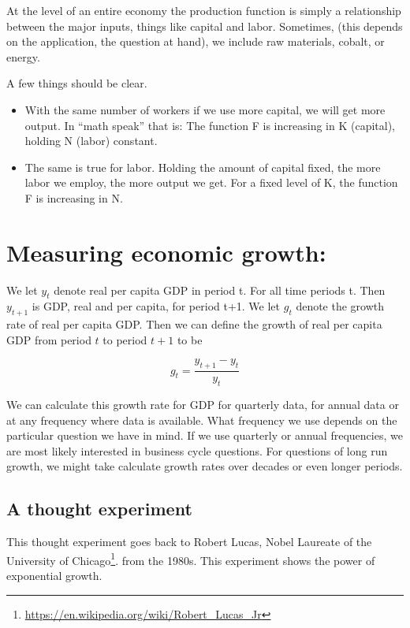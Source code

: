 \documentclass[
]{book}
\providecommand{\tightlist}{%
  \setlength{\itemsep}{0pt}\setlength{\parskip}{0pt}}
\begin{document}
At the level of an entire economy the production function is simply a relationship between the major inputs, things like capital and labor. Sometimes, (this depends on the application, the question at hand), we include raw materials, cobalt, or energy.

A few things should be clear.

\begin{itemize}
\tightlist
\item
  With the same number of workers if we use more capital, we will get more output. In ``math speak'' that is: The function F is increasing in K (capital), holding N (labor) constant.\\
\item
  The same is true for labor. Holding the amount of capital fixed, the more labor we employ, the more output we get. For a fixed level of K, the function F is increasing in N.
\end{itemize}

\hypertarget{measuring-economic-growth}{%
\section{Measuring economic growth:}\label{measuring-economic-growth}}

We let \(y_t\) denote real per capita GDP in period t. For all time periods t. Then \(y_{t+1}\) is GDP, real and per capita, for period t+1. We let \(g_t\) denote the growth rate of real per capita GDP. Then we can define the growth of real per capita GDP from period \(t\) to period \(t+1\) to be

\[g_t = \frac{y_{t+1} - y_t}{y_t}\]

We can calculate this growth rate for GDP for quarterly data, for annual data or at any frequency where data is available. What frequency we use depends on the particular question we have in mind. If we use quarterly or annual frequencies, we are most likely interested in business cycle questions. For questions of long run growth, we might take calculate growth rates over decades or even longer periods.

\hypertarget{a-thought-experiment}{%
\subsection{A thought experiment}\label{a-thought-experiment}}

This thought experiment goes back to Robert Lucas, Nobel Laureate of the University of Chicago\footnote{\url{https://en.wikipedia.org/wiki/Robert_Lucas_Jr}}. from the 1980s. This experiment shows the power of exponential growth.
\end{document}
